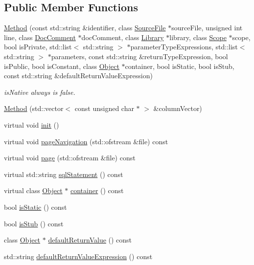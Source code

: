 \subsection*{Public Member Functions}
\begin{CompactItemize}
\item 
\hyperlink{classvjassdoc_1_1Method_b8d4ae00da196848f84771240386414a}{Method} (const std::string \&identifier, class \hyperlink{classvjassdoc_1_1SourceFile}{SourceFile} $\ast$sourceFile, unsigned int line, class \hyperlink{classvjassdoc_1_1DocComment}{DocComment} $\ast$docComment, class \hyperlink{classvjassdoc_1_1Library}{Library} $\ast$library, class \hyperlink{classvjassdoc_1_1Scope}{Scope} $\ast$scope, bool isPrivate, std::list$<$ std::string $>$ $\ast$parameterTypeExpressions, std::list$<$ std::string $>$ $\ast$parameters, const std::string \&returnTypeExpression, bool isPublic, bool isConstant, class \hyperlink{classvjassdoc_1_1Object}{Object} $\ast$container, bool isStatic, bool isStub, const std::string \&defaultReturnValueExpression)
\begin{CompactList}\small\item\em isNative always is false. \item\end{CompactList}\item 
\hyperlink{classvjassdoc_1_1Method_f2fa55c203e4bcf6ef1c421f9a824993}{Method} (std::vector$<$ const unsigned char $\ast$ $>$ \&columnVector)
\item 
virtual void \hyperlink{classvjassdoc_1_1Method_cd115b1b9a459752e6613925be8e9daf}{init} ()
\item 
virtual void \hyperlink{classvjassdoc_1_1Method_d5d61124a7d28d7e4680cc0df6cc5deb}{pageNavigation} (std::ofstream \&file) const 
\item 
virtual void \hyperlink{classvjassdoc_1_1Method_564b24f8b05185ac9399dd36a9b0ad1a}{page} (std::ofstream \&file) const 
\item 
virtual std::string \hyperlink{classvjassdoc_1_1Method_0a9c4b3b9cb2043eb1454ae72bbfe04f}{sqlStatement} () const 
\item 
virtual class \hyperlink{classvjassdoc_1_1Object}{Object} $\ast$ \hyperlink{classvjassdoc_1_1Method_647eb53622d1ef78100a97ef9eac9fe3}{container} () const 
\item 
bool \hyperlink{classvjassdoc_1_1Method_2e54844815dda9eef31bbe4e6fc4c67b}{isStatic} () const 
\item 
bool \hyperlink{classvjassdoc_1_1Method_57b35b4da03b3004ce983ea3e19a121e}{isStub} () const 
\item 
class \hyperlink{classvjassdoc_1_1Object}{Object} $\ast$ \hyperlink{classvjassdoc_1_1Method_90730e7a0393fd3a7936c3b181f5a4c0}{defaultReturnValue} () const 
\item 
std::string \hyperlink{classvjassdoc_1_1Method_2601819a6deea5970da2cac5b83bb8b0}{defaultReturnValueExpression} () const 
\end{CompactItemize}


